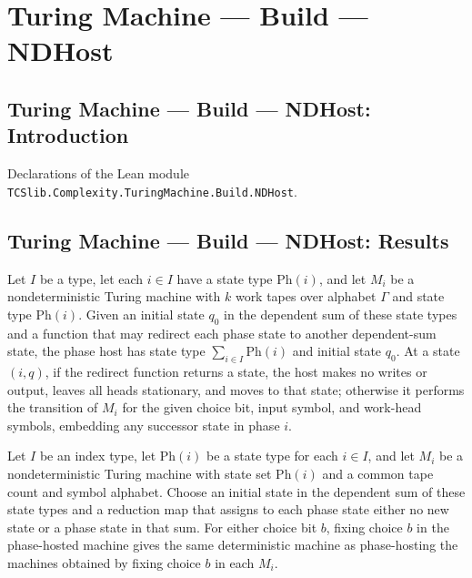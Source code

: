 \section{Turing Machine --- Build --- NDHost}
\subsection*{Turing Machine --- Build --- NDHost: Introduction}

Declarations of the Lean module \texttt{TCSlib.Complexity.TuringMachine.Build.NDHost}.

\subsection*{Turing Machine --- Build --- NDHost: Results}

\begin{definition}
\label{Turing.NDTM.phaseHostND}
\leanok
{}
Let $I$ be a type, let each $i \in I$ have a state type $\mathrm{Ph}(i)$, and let $M_i$
be a nondeterministic Turing machine with $k$ work tapes over alphabet $\Gamma$ and
state type $\mathrm{Ph}(i)$. Given an initial state $q_0$ in the dependent sum of these
state types and a function that may redirect each phase state to another dependent-sum
state, the phase host has state type $\sum_{i\in I}\mathrm{Ph}(i)$ and initial state
$q_0$. At a state $(i,q)$, if the redirect function returns a state, the host makes no
writes or output, leaves all heads stationary, and moves to that state; otherwise it
performs the transition of $M_i$ for the given choice bit, input symbol, and work-head
symbols, embedding any successor state in phase $i$.
\end{definition}

\begin{theorem}
\label{Turing.NDTM.phaseHostND_fixChoice}
\leanok
{}
Let $I$ be an index type, let $\mathrm{Ph}(i)$ be a state type for each $i\in I$, and
let $M_i$ be a nondeterministic Turing machine with state set $\mathrm{Ph}(i)$ and a
common tape count and symbol alphabet. Choose an initial state in the dependent sum of
these state types and a reduction map that assigns to each phase state either no new
state or a phase state in that sum. For either choice bit $b$, fixing choice $b$ in the
phase-hosted machine gives the same deterministic machine as phase-hosting the machines
obtained by fixing choice $b$ in each $M_i$.
\end{theorem}

